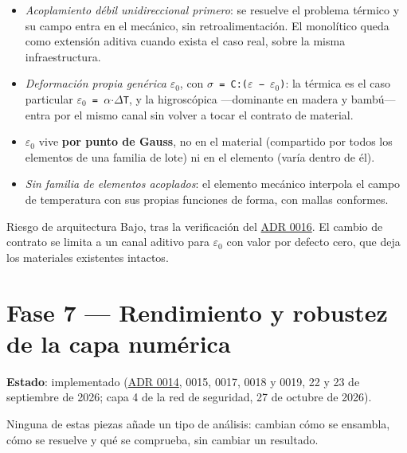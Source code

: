 \documentclass[11pt,oneside]{report}
\begin{document}
\begin{itemize}
  \item \textit{Acoplamiento débil unidireccional primero}: se resuelve el problema térmico y su campo entra en el mecánico, sin retroalimentación. El monolítico queda como extensión aditiva cuando exista el caso real, sobre la misma infraestructura.
  \item \textit{Deformación propia genérica} \texttt{\ensuremath{\varepsilon}\ensuremath{_{0}}}, con \texttt{\ensuremath{\sigma} = C:(\ensuremath{\varepsilon} − \ensuremath{\varepsilon}\ensuremath{_{0}})}: la térmica es el caso particular \texttt{\ensuremath{\varepsilon}\ensuremath{_{0}} = \ensuremath{\alpha}\ensuremath{\cdot}\ensuremath{\Delta}T}, y la higroscópica ---dominante en madera y bambú--- entra por el mismo canal sin volver a tocar el contrato de material.
  \item \texttt{\ensuremath{\varepsilon}\ensuremath{_{0}}} vive \textbf{por punto de Gauss}, no en el material (compartido por todos los elementos de una familia de lote) ni en el elemento (varía dentro de él).
  \item \textit{Sin familia de elementos acoplados}: el elemento mecánico interpola el campo de temperatura con sus propias funciones de forma, con mallas conformes.
\end{itemize}

\begin{infobox}{Riesgo de arquitectura}
Bajo, tras la verificación del \hyperref[adr:0016]{ADR 0016}. El cambio de contrato se limita a un canal aditivo para \texttt{\ensuremath{\varepsilon}\ensuremath{_{0}}} con valor por defecto cero, que deja los materiales existentes intactos.
\end{infobox}

\section{Fase 7 --- Rendimiento y robustez de la capa numérica}

\textbf{Estado}: implementado (\hyperref[adr:0014]{ADR 0014}, 0015, 0017, 0018 y 0019, 22 y 23 de septiembre de 2026; capa 4 de la red de seguridad, 27 de octubre de 2026).

Ninguna de estas piezas añade un tipo de análisis: cambian cómo se ensambla, cómo se resuelve y qué se comprueba, sin cambiar un resultado.
\end{document}
